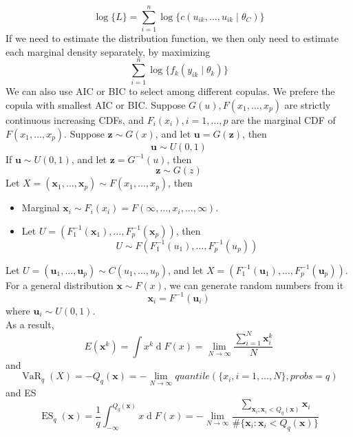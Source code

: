 \documentclass[11pt]{article}
\theoremstyle{definition}
\DeclareMathOperator{\diff}{d}
\DeclareMathOperator{\VaR}{VaR}
\DeclareMathOperator{\ES}{ES}
\begin{document}
\[
\log\{L\}=\sum_{i=1}^n \log\{c(u_{ik}, \ldots, u_{ik}\mid \theta_C)\}
\]
If we need to estimate the distribution function, we then only need to estimate each marginal density separately, by maximizing 
\[
\sum_{i=1}^n \log\{f_k(y_{ik}\mid \theta_k)\}
\]
We can also use AIC or BIC to select among different copulas. We prefere the copula with smallest AIC or BIC.
Suppose $G(u), F(x_1,\ldots, x_p)$ are strictly continuous increasing CDFs, and $F_i(x_i), i = 1,\ldots, p$ are the marginal CDF of $F(x_1,\ldots, x_p)$.
Suppose $\mathbf{z}\sim G(x)$, and let $\mathbf{u}=G(\mathbf{z})$, then
\[
\mathbf{u}\sim U(0,1)
\]
If $\mathbf{u}\sim U(0,1)$, and let $\mathbf{z}=G^{-1}(u)$, then
\[
\mathbf{z}\sim G(z)
\]
Let $X=(\mathbf{x}_1, \ldots, \mathbf{x}_p)\sim F(x_1,\ldots, x_p)$, then
\begin{itemize}
  \item Marginal $\mathbf{x}_i\sim F_i(x_i)=F(\infty, \ldots, x_i,\ldots, \infty)$.
  \item Let $U=(F_1^{-1}(\mathbf{x}_1),\ldots, F_p^{-1}(\mathbf{x}_p))$, then
  \[
U\sim F(F_1^{-1}(u_1),\ldots, F_p^{-1}(u_p))
  \]
\end{itemize}
Let $U=(\mathbf{u}_1, \ldots, \mathbf{u}_p)\sim C(u_1,\ldots, u_p)$, and let $X=(F_1^{-1}(\mathbf{u}_1), \ldots, F_p^{-1}(\mathbf{u}_p))$.\\
For a general distribution $\mathbf{x}\sim F(x)$, we can generate random numbers from it
\[
\mathbf{x}_i = F^{-1}(\mathbf{u}_i)
\]
where $\mathbf{u}_i\sim U(0,1)$.\\
As a result, 
\[
E(\mathbf{x}^k)=\int x^k\diff F(x) = \lim_{N\to \infty}\frac{\sum_{i=1}^N \mathbf{x}_i^k}{N}
\]
and
\[
\VaR_q(X)=-Q_q(\mathbf{x})=-\lim_{N\to\infty} \textit{quantile}(\{x_i, i = 1, \ldots, N\}, \textit{probs} = q)
\]
and ES
\[
\ES_q(\mathbf{x})= \frac{1}{q}\int_{-\infty}^{Q_q(\mathbf{x})}x\diff F(x)=-\lim_{N\to\infty}\frac{\sum_{\mathbf{x}_i; \mathbf{x}_i < Q_q(\mathbf{x})}\mathbf{x}_i}{\#\{\mathbf{x}_i:\mathbf{x}_i< Q_q(\mathbf{x})\}}
\]
\end{document}
